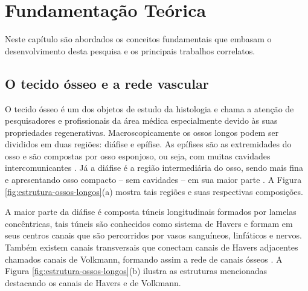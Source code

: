 \chapter[Fundamentação Teórica]{Fundamentação Teórica}

Neste capítulo são abordados os conceitos fundamentais que embasam o desenvolvimento desta pesquisa e os principais trabalhos correlatos.

\section{O tecido ósseo e a rede vascular}
O tecido ósseo é um dos objetos de estudo da histologia e chama a atenção de pesquisadores e profissionais da área médica especialmente devido às suas propriedades regenerativas. Macroscopicamente os ossos longos podem ser divididos em duas regiões: diáfise e epífise. As epífises são as extremidades do osso e são compostas por osso esponjoso, ou seja, com muitas cavidades intercomunicantes \cite{junqueira1985histologia}. Já a diáfise é a região intermediária do osso, sendo mais fina e apresentando osso compacto -- sem cavidades -- em sua maior parte \cite{junqueira1985histologia}. A Figura \ref{fig:estrutura-ossos-longos}(a) mostra tais regiões e suas respectivas composições.

A maior parte da diáfise é composta túneis longitudinais formados por lamelas concêntricas, tais túneis são conhecidos como sistema de Havers e formam em seus centros canais que são percorridos por vasos sanguíneos, linfáticos e nervos. Também existem canais transversais que conectam canais de Havers adjacentes chamados canais de Volkmann, formando assim a rede de canais ósseos \cite{junqueira1985histologia}. A Figura \ref{fig:estrutura-ossos-longos}(b) ilustra as estruturas mencionadas destacando os canais de Havers e de Volkmann.

